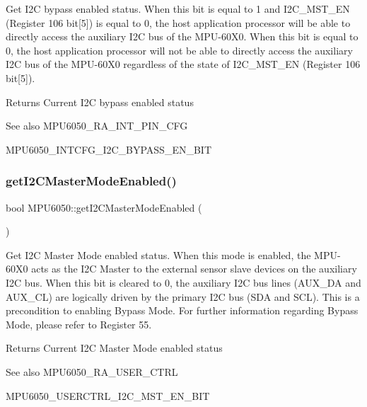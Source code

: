 Get I2C bypass enabled status. When this bit is equal to 1 and I2\+C\+\_\+\+M\+S\+T\+\_\+\+EN (Register 106 bit\mbox{[}5\mbox{]}) is equal to 0, the host application processor will be able to directly access the auxiliary I2C bus of the M\+P\+U-\/60\+X0. When this bit is equal to 0, the host application processor will not be able to directly access the auxiliary I2C bus of the M\+P\+U-\/60\+X0 regardless of the state of I2\+C\+\_\+\+M\+S\+T\+\_\+\+EN (Register 106 bit\mbox{[}5\mbox{]}). \begin{DoxyReturn}{Returns}
Current I2C bypass enabled status 
\end{DoxyReturn}
\begin{DoxySeeAlso}{See also}
M\+P\+U6050\+\_\+\+R\+A\+\_\+\+I\+N\+T\+\_\+\+P\+I\+N\+\_\+\+C\+FG 

M\+P\+U6050\+\_\+\+I\+N\+T\+C\+F\+G\+\_\+\+I2\+C\+\_\+\+B\+Y\+P\+A\+S\+S\+\_\+\+E\+N\+\_\+\+B\+IT 
\end{DoxySeeAlso}
\mbox{\label{class_m_p_u6050_a6b45e538f2082eb1b1975ed56e3e21bc}} 
\subsubsection{\texorpdfstring{getI2CMasterModeEnabled()}{getI2CMasterModeEnabled()}}
{\footnotesize\ttfamily bool M\+P\+U6050\+::get\+I2\+C\+Master\+Mode\+Enabled (\begin{DoxyParamCaption}{ }\end{DoxyParamCaption})}

Get I2C Master Mode enabled status. When this mode is enabled, the M\+P\+U-\/60\+X0 acts as the I2C Master to the external sensor slave devices on the auxiliary I2C bus. When this bit is cleared to 0, the auxiliary I2C bus lines (A\+U\+X\+\_\+\+DA and A\+U\+X\+\_\+\+CL) are logically driven by the primary I2C bus (S\+DA and S\+CL). This is a precondition to enabling Bypass Mode. For further information regarding Bypass Mode, please refer to Register 55. \begin{DoxyReturn}{Returns}
Current I2C Master Mode enabled status 
\end{DoxyReturn}
\begin{DoxySeeAlso}{See also}
M\+P\+U6050\+\_\+\+R\+A\+\_\+\+U\+S\+E\+R\+\_\+\+C\+T\+RL 

M\+P\+U6050\+\_\+\+U\+S\+E\+R\+C\+T\+R\+L\+\_\+\+I2\+C\+\_\+\+M\+S\+T\+\_\+\+E\+N\+\_\+\+B\+IT 
\end{DoxySeeAlso}
\mbox{\label{class_m_p_u6050_ae15f6043a74c9c9bf9754824802ce8d3}} 
